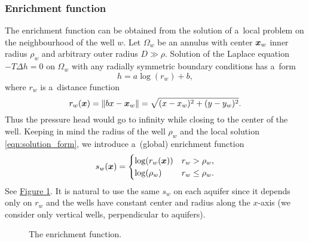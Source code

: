 \documentclass[FM,Dis]{tulthesis}
\newcommand{\fig}[1]{\hyperref[#1]{Figure \ref{#1}}}
\newcommand{\figpath}{figures/}
\begin{document}
\subsubsection{Enrichment function}
The enrichment function can be obtained from the solution of a~local problem on the neighbourhood of the well $w$.
Let $\Omega_w$ be an annulus with center $\mathbf{\boldsymbol{x}}_w$ inner radius $\rho_w$ and arbitrary outer radius $D \gg \rho$.
Solution of the Laplace equation $-T \Delta h = 0$ on $\Omega_w$ with any radially symmetric boundary conditions has a~form
%
\begin{equation} \label{eqn:solution_form}
  h = a \log(r_w)+b, %
\end{equation}
where $r_w$ is a~distance function
\begin{equation} \label{eqn:distance}
r_w(\mathbf{\boldsymbol{x}}) = \|\\bx - \mathbf{\boldsymbol{x}}_w\|= \sqrt{(x-x_w)^2+(y-y_w)^2}.
\end{equation}
%
Thus the pressure head would go to infinity while closing to the center of the well.
Keeping in mind the radius of the well $\rho_w$ and the local solution \eqref{eqn:solution_form}, 
we introduce a~(global) enrichment function
%
\begin{equation}
\label{eqn:enrich_func}
s_w(\mathbf{\boldsymbol{x}}) = 
  \begin{cases}
  \log(r_w(\mathbf{\boldsymbol{x}})) & r_w > \rho_w,\\
  \log(\rho_w) & r_w \le \rho_w.\\
  \end{cases}
\end{equation}
See \fig{fig:enrich_func}.
It is natural to use the same $s_w$ on each aquifer since it depends only on $r_w$ and the wells have constant center and radius along the $x$-axis
(we consider only vertical wells, perpendicular to aquifers).
%

\begin{figure}[!htb]
  \begin{center}         
    \def\svgwidth{0.5\textwidth}
    
  \end{center}
  \caption{The enrichment function.}
  \label{fig:enrich_func}
\end{figure}
\end{document}
